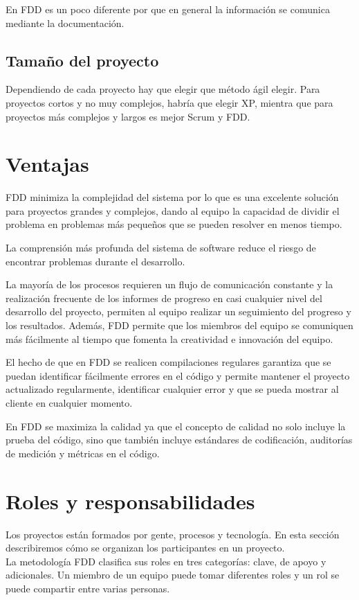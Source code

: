 \documentclass[11pt]{article}
\begin{document}
En FDD es un poco diferente por que en general la información se comunica mediante la documentación.

\subsection*{Tamaño del proyecto}

Dependiendo de cada proyecto hay que elegir que método ágil elegir. Para proyectos cortos y no muy complejos, habría que elegir XP, mientra que para proyectos más complejos y largos es mejor Scrum y FDD.


\section{Ventajas}
FDD minimiza la complejidad del sistema por lo que es una excelente solución para proyectos grandes y complejos, dando al equipo la capacidad de dividir el problema en problemas más pequeños que se pueden resolver en menos tiempo.

La comprensión más profunda del sistema de software reduce el riesgo de encontrar problemas durante el desarrollo.

La mayoría de los procesos requieren un flujo de comunicación constante y la realización frecuente de los informes de progreso en casi cualquier nivel del desarrollo del proyecto, permiten al equipo realizar un seguimiento del progreso y los resultados. Además, FDD permite que los miembros del equipo se comuniquen más fácilmente al tiempo que fomenta la creatividad e innovación del equipo.

El hecho de que en FDD se realicen compilaciones regulares garantiza que se puedan identificar fácilmente errores en el código y permite mantener el proyecto actualizado regularmente, identificar cualquier error y que se pueda mostrar al cliente en cualquier momento. 

En FDD se maximiza la calidad ya que el concepto de calidad no solo incluye la prueba del código, sino que también incluye estándares de codificación, auditorías de medición y métricas en el código.

\section{Roles y responsabilidades}

Los proyectos están formados por gente, procesos y tecnología. En esta sección describiremos cómo se organizan los participantes en un proyecto.\\
La metodología FDD clasifica sus roles en tres categorías: clave, de apoyo y adicionales. Un miembro de un equipo puede tomar diferentes roles y un rol se puede compartir entre varias personas.\\
\end{document}
